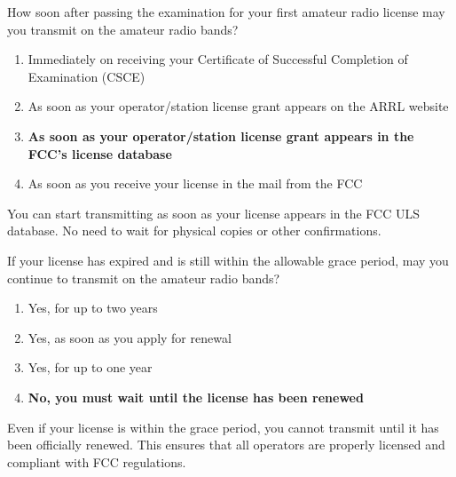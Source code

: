 \begin{tcolorbox}[colback=gray!10!white,colframe=black!75!black,title={T1C10}]
    How soon after passing the examination for your first amateur radio license may you transmit on the amateur radio bands?
    \begin{enumerate}[label=\Alph*),noitemsep]
        \item Immediately on receiving your Certificate of Successful Completion of Examination (CSCE)
        \item As soon as your operator/station license grant appears on the ARRL website
        \item \textbf{As soon as your operator/station license grant appears in the FCC’s license database}
        \item As soon as you receive your license in the mail from the FCC
    \end{enumerate}
\end{tcolorbox}
You can start transmitting as soon as your license appears in the FCC ULS database. No need to wait for physical copies or other confirmations.

\begin{tcolorbox}[colback=gray!10!white,colframe=black!75!black,title={T1C11}]
    If your license has expired and is still within the allowable grace period, may you continue to transmit on the amateur radio bands?
    \begin{enumerate}[label=\Alph*),noitemsep]
        \item Yes, for up to two years
        \item Yes, as soon as you apply for renewal
        \item Yes, for up to one year
        \item \textbf{No, you must wait until the license has been renewed}
    \end{enumerate}
\end{tcolorbox}
Even if your license is within the grace period, you cannot transmit until it has been officially renewed. This ensures that all operators are properly licensed and compliant with FCC regulations.
